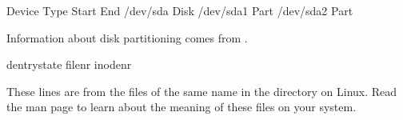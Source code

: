 \documentclass[letterpaper,10pt,english]{sphinxmanual}
\begin{document}
\begin{sphinxVerbatim}[commandchars=\\\{\}]
Device       Type      Start        End               
    
/dev/sda     Disk                              
/dev/sda1    Part                              
/dev/sda2    Part                        
\end{sphinxVerbatim}

\sphinxAtStartPar
Information about disk partitioning comes from .

\begin{sphinxVerbatim}[commandchars=\\\{\}]
dentry\PYGZhy{}state          
     file\PYGZhy{}nr       
    inode\PYGZhy{}nr   
\end{sphinxVerbatim}

\sphinxAtStartPar
These lines are from the files of the same name in the 
directory on Linux. Read the  man page to learn about the meaning of
these files on your system.
\end{document}
